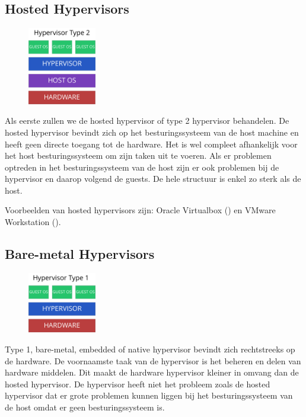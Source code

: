 \documentclass[pdftex,a4paper,12pt,twoside]{report}
\begin{document}
\newpage

\subsection{Hosted Hypervisors}

\begin{figure}
    \centering
    \includegraphics[width=3cm]{img/hypervisor-2}\\
\end{figure}
Als eerste zullen we de hosted hypervisor of type 2 hypervisor behandelen. De hosted hypervisor bevindt zich op het besturingssysteem van de host machine en heeft geen directe toegang tot de hardware. Het is wel compleet afhankelijk voor het host besturingssysteem om zijn taken uit te voeren. Als er problemen optreden in het besturingssysteem van de host zijn er ook problemen bij de hypervisor en daarop volgend de guests. De hele structuur is enkel zo sterk als de host.

Voorbeelden van hosted hypervisors zijn: Oracle Virtualbox (\cite{Oracle2016}) en VMware Workstation (\cite{VMware2016}).

\subsection{Bare-metal Hypervisors}

\begin{figure}
    \centering
    \includegraphics[width=3cm]{img/hypervisor-1}\\
\end{figure}

Type 1, bare-metal, embedded of native hypervisor bevindt zich rechtstreeks op de hardware. De voornaamste taak van de hypervisor is het beheren en delen van hardware middelen. Dit maakt de hardware hypervisor kleiner in omvang dan de hosted hypervisor. De hypervisor heeft niet het probleem zoals de hosted hypervisor dat er grote problemen kunnen liggen bij het besturingssysteem van de host omdat er geen besturingssysteem is.
\end{document}
